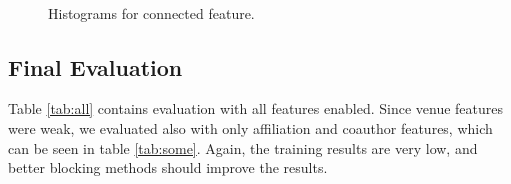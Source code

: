 \documentclass[twocolumn,letterpaper]{article}
\begin{document}
\begin{figure}[ht!]%
\centering 
{}\qquad 
{}\\ 
\caption{Histograms for connected feature.} 
\label{fig:3figs}
\end{figure}

\subsection{Final Evaluation} %
\label{sub:final_evaluation}
Table \ref{tab:all} contains evaluation with all features enabled. Since venue features were weak, we evaluated also with only affiliation and coauthor features, which can be seen in table \ref{tab:some}. Again, the training results are very low, and better blocking methods should improve the results. 
\end{document}
